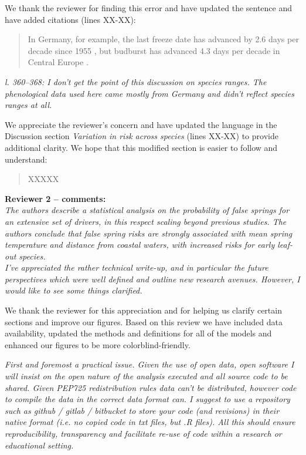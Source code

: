 \documentclass[11pt,a4paper]{article}
\begin{document}
We thank the reviewer for finding this error and have updated the sentence and have added citations (lines XX-XX):

\begin{quotation}
\noindent  In Germany, for example, the last freeze date has advanced by 2.6 days per decade since 1955 \citep{Zohner2016}, but budburst has advanced 4.3 days per decade in Central Europe \citep{Fu2014,Vitasse2018}.
\end{quotation}


\textit{l. 360–368: I don’t get the point of this discussion on species ranges. The phenological data used here came mostly from Germany and didn’t reflect species ranges at all.}

We appreciate the reviewer's concern and have updated the language in the Discussion section \textit{Variation in risk across species} (lines XX-XX) to provide additional clarity. We hope that this modified section is easier to follow and understand: 

\begin{quotation}
\noindent  XXXXX
\end{quotation}


\textbf {Reviewer 2 -- comments:} \\


\textit{The authors describe a statistical analysis on the probability of false springs for an extensive set of drivers, in this respect scaling beyond previous studies. The authors conclude that false spring risks are strongly associated with mean spring temperature and distance from coastal waters, with increased risks for early leaf-out species. \\

I've appreciated the rather technical write-up, and in particular the future perspectives which were well defined and outline new research avenues. However, I would like to see some things clarified.}

We thank the reviewer for this appreciation and for helping us clarify certain sections and improve our figures. Based on this review we have included data availability, updated the methods and definitions for all of the models and enhanced our figures to be more colorblind-friendly. 

\textit{First and foremost a practical issue. Given the use of open data, open software I will insist on the open nature of the analysis executed and all source code to be shared. Given PEP725 redistribution rules data can't be distributed, however code to compile the data in the correct data format can. I suggest to use a repository such as github / gitlab / bitbucket to store your code (and revisions) in their native format (i.e. no copied code in txt files, but .R files). All this should ensure reproducibility, transparency and facilitate re-use of code within a research or educational setting.}
\end{document}
